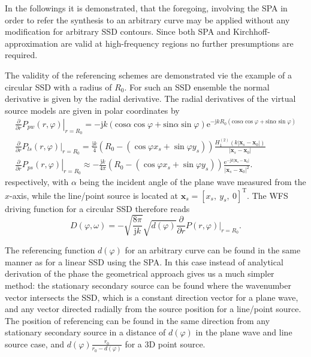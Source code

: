 \documentclass[12pt,a4paper]{article}
\newcommand{\te}{\mathrm{e}}
\newcommand{\ti}{\mathrm{j}}
\newcommand{\sinfi}{\sin\varphi}
\newcommand{\cosfi}{\cos\varphi}
\newcommand{\vxo}{\mathbf{x}_0}
\begin{document}
\vspace{3mm}
In the followings it is demonstrated, that the foregoing, involving the SPA in order to refer the synthesis to an arbitrary curve may be applied without any modification for arbitrary SSD contours. Since both SPA and Kirchhoff-approximation are valid at high-frequency regions no further presumptions are required.

The validity of the referencing schemes are demonstrated vie the example of a circular SSD with a radius of $R_0$. For such an SSD ensemble the normal derivative is given by the radial derivative. The radial derivatives of the virtual source models are given in polar coordinates by
\begin{eqnarray}
\frac{\partial}{\partial r} \left. P_{pw}(r,\varphi) \right|_{r = R_0} = -\ti k \left( \mathrm{cos}\alpha\cosfi + \mathrm{sin}\alpha \sinfi \right) \te^{-\ti k R_0 \left( \mathrm{cos}\alpha\cosfi + \mathrm{sin}\alpha \sinfi \right)} 
\\
\frac{\partial}{\partial r} \left. P_{ls}(r,\varphi) \right|_{r = R_0} =
\frac{\ti k }{4} \left( R_0 - ( \cosfi x_s + \sinfi y_s ) \right) \frac{H_1^{(2)} \left( k |\mathbf{x}_s - \vxo | \right) }{|\mathbf{x}_s - \vxo | }
\\
\frac{\partial}{\partial r} \left. P_{ps}(r,\varphi) \right|_{r = R_0} \approx
-\frac{\ti k }{4\pi}\left( R_0 - ( \cosfi x_s + \sinfi y_s ) \right)
\frac{\te^{-\ti k |\mathbf{x}_s - \vxo |}}{|\mathbf{x}_s - \vxo |^2}.
\end{eqnarray}
respectively, with $\alpha$ being the incident angle of the plane wave measured from the $x$-axis, while the line/point source is located at $\mathbf{x}_s = [x_s,\ y_s,\ 0]^{\mathrm{T}}$. The WFS driving function for a circular SSD therefore reads
\begin{equation}
D(\varphi,\omega) = - \sqrt{\frac{8\pi}{\ti k}}\sqrt{d(\varphi)} \frac{\partial}{\partial r} \left. P(r,\varphi) \right|_{r = R_0}.
\end{equation}

\vspace{3mm}
The referencing function $d(\varphi)$ for an arbitrary curve can be found in the same manner as for a linear SSD using the SPA. In this case instead of analytical derivation of the phase the geometrical approach gives us a much simpler method: the stationary secondary source can be found where the wavenumber vector intersects the SSD, which is a constant direction vector for a plane wave, and any vector directed radially from the source position for a line/point source. The position of referencing can be found in the same direction from any stationary secondary source in a distance of $d(\varphi)$ in the plane wave and line source case, and $d(\varphi)\frac{r_0}{r_0-d(\varphi)}$ for a 3D point source.
\end{document}
